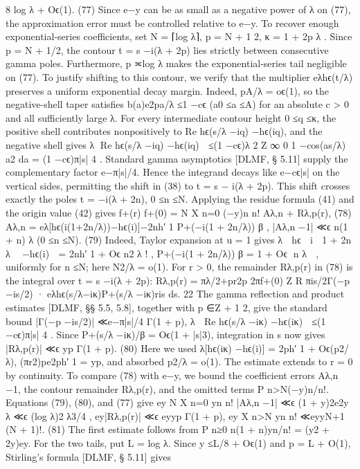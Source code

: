 8 log λ + Oϵ(1).
(77)
Since e−y can be as small as a negative power of λ on (77), the approximation error must be
controlled relative to e−y.
To recover enough exponential-series coeﬃcients, set
N = ⌈log λ⌉,
p = N + 1
2,
κ = 1 + 2p
λ .
Since p = N + 1/2, the contour t = s −i(λ + 2p) lies strictly between consecutive gamma poles.
Furthermore, p ≍log λ makes the exponential-series tail negligible on (77). To justify shifting
to this contour, we verify that the multiplier eλhϵ(t/λ) preserves a uniform exponential decay
margin. Indeed, pA/λ = oϵ(1), so the negative-shell taper satisﬁes
b(a)e2pa/λ ≤1 −cϵ
(a0 ≤a ≤A)
for an absolute c > 0 and all suﬃciently large λ. For every intermediate contour height 0 ≤q ≤κ,
the positive shell contributes nonpositively to Re hϵ(s/λ −iq) −hϵ(iq), and the negative shell
gives
λ
Re hϵ(s/λ −iq) −hϵ(iq)
 ≤(1 −cϵ)λ
2
Z ∞
0
1 −cos(as/λ)
a2
da
= (1 −cϵ)π|s|
4 .
Standard gamma asymptotics [DLMF, § 5.11] supply the complementary factor e−π|s|/4. Hence
the integrand decays like e−cϵ|s| on the vertical sides, permitting the shift in (38) to t = s −
i(λ + 2p). This shift crosses exactly the poles t = −i(λ + 2n), 0 ≤n ≤N.
Applying the residue formula (41) and the origin value (42) gives
f+(r)
f+(0) =
N
X
n=0
(−y)n
n!
Aλ,n + Rλ,p(r),
(78)
Aλ,n = eλ[hϵ(i(1+2n/λ))−hϵ(i)]−2nh′
1 P+(−i(1 + 2n/λ))
β
,
|Aλ,n −1| ≪ϵ
n(1 + n)
λ
(0 ≤n ≤N).
(79)
Indeed, Taylor expansion at u = 1 gives
λ

hϵ

i

1 + 2n
λ

−hϵ(i)

= 2nh′
1 + Oϵ
n2
λ
!
,
P+(−i(1 + 2n/λ))
β
= 1 + Oϵ
n
λ

,
uniformly for n ≤N; here N2/λ = o(1).
For r > 0, the remainder Rλ,p(r) in (78) is the integral over t = s −i(λ + 2p):
Rλ,p(r) = πλ/2+pr2p
2πf+(0)
Z
R
πis/2Γ(−p −is/2)
· eλhϵ(s/λ−iκ)P+(s/λ −iκ)ris ds.
22
The gamma reﬂection and product estimates [DLMF, §§ 5.5, 5.8], together with p ∈Z + 1
2, give
the standard bound
|Γ(−p −is/2)| ≪e−π|s|/4
Γ(1 + p),
λ
 Re hϵ(s/λ −iκ) −hϵ(iκ)
 ≤(1 −cϵ)π|s|
4 .
Since P+(s/λ −iκ)/β = Oϵ(1 + |s|3), integration in s now gives
|Rλ,p(r)| ≪ϵ
yp
Γ(1 + p).
(80)
Here we used
λ[hϵ(iκ) −hϵ(i)] = 2ph′
1 + Oϵ(p2/λ),
(πr2)pe2ph′
1 = yp,
and absorbed p2/λ = o(1). The estimate extends to r = 0 by continuity.
To compare (78) with e−y, we bound the coeﬃcient errors Aλ,n −1, the contour remainder
Rλ,p(r), and the omitted terms P
n>N(−y)n/n!. Equations (79), (80), and (77) give
ey
N
X
n=0
yn
n! |Aλ,n −1| ≪ϵ
(1 + y)2e2y
λ
≪ϵ
(log λ)2
λ3/4
,
ey|Rλ,p(r)| ≪ϵ
eyyp
Γ(1 + p),
ey X
n>N
yn
n! ≪eyyN+1
(N + 1)!.
(81)
The ﬁrst estimate follows from P
n≥0 n(1 + n)yn/n! = (y2 + 2y)ey.
For the two tails, put
L = log λ. Since y ≤L/8 + Oϵ(1) and p = L + O(1), Stirling’s formula [DLMF, § 5.11] gives
